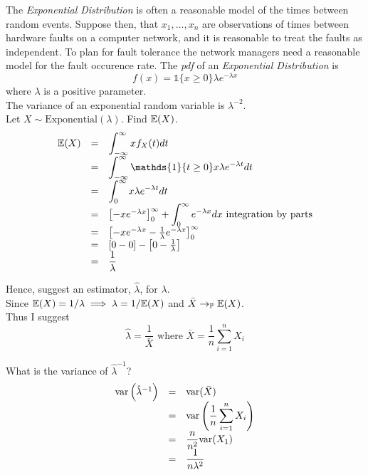 \documentclass[11pt,a4paper]{article}
\begin{document}
\question
The \textit{Exponential Distribution} is often a reasonable model of the times between random events. Suppose then, that ${x_1,\dots,x_n}$ are observations of times between hardware faults on a computer network, and it is reasonable to treat the faults as independent. To plan for fault tolerance the network managers need a reasonable model for the fault occurence rate. The \textit{pdf} of an \textit{Exponential Distribution} is
$$f(x)=\mathds{1}\{x\geq0\}\lambda e^{-\lambda x}$$
where $\lambda$ is a positive parameter.\\
The variance of an exponential random variable is $\lambda^{-2}$.\\

\qpartnb Let $X\sim\text{Exponential}(\lambda)$. Find $\mathbb{E}(X)$.\\

\apart
\[\begin{array}{rcl}
\expect(X)&=&\displaystyle\int_{-\infty}^\infty xf_X(t)dt\\
&=&\displaystyle\int_{-\infty}^\infty\mathds{1}\{t\geq0\}x\lambda e^{-\lambda t}dt\\
&=&\displaystyle\int_0^\infty x\lambda e^{-\lambda t}dt\\
&=&\left[-xe^{-\lambda x}\right]_0^\infty+\displaystyle\int_0^\infty e^{-\lambda x}dx \text{ integration by parts}\\
&=&\left[-xe^{-\lambda x}-\frac1\lambda e^{-\lambda x}\right]_0^\infty\\
&=&[0-0]-\left[0-\frac1\lambda\right]\\
&=&\dfrac1\lambda
\end{array}\]

\qpartnb Hence, suggest an estimator, $\hat\lambda$, for $\lambda$.\\

\apart
Since $\mathbb{E}(X)=1/\lambda\implies\lambda=1/\mathbb{E}(X)$ and $\bar{X}\to_{\mathbb{P}}\mathbb{E}(X)$.\\
Thus I suggest
$$\hat\lambda=\frac1{\bar{X}}\text{ where }\bar{X}=\frac1n\sum_{i=1}^nX_i$$

\qpartnb What is the variance of $\hat\lambda^{-1}$?\\

\apart
\[\begin{array}{rcl}
\mathrm{var}\left(\hat\lambda^{-1}\right)&=&\mathrm{var}(\bar{X})\\
&=&\mathrm{var}\left(\dfrac1n\displaystyle\sum_{i=1}^nX_i\right)\\
&=&\dfrac{n}{n^2}\mathrm{var}(X_1)\\
&=&\dfrac{1}{n\lambda^2}
\end{array}\]
\end{document}
